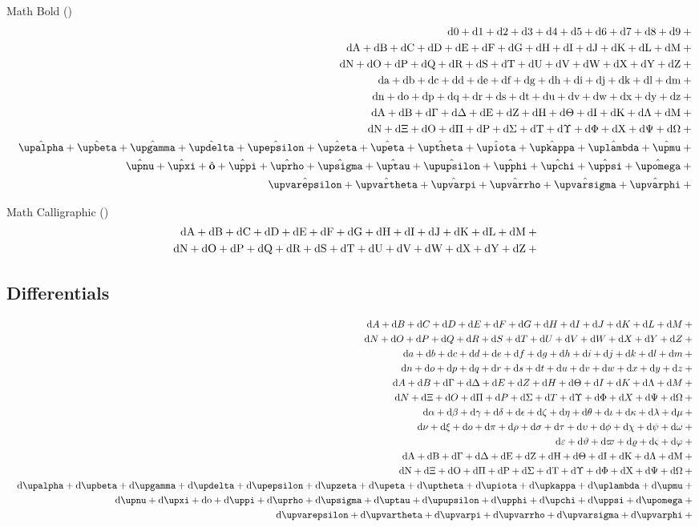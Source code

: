 \documentclass[11pt, a4paper, oneside]{article}
\newcommand{\dd}{\mathrm{d}}
\theoremstyle{Plain}
\theoremstyle{Definition}
\theoremstyle{Remark}
\begin{document}
\begin{appendix}
	Math Bold (\texttt{\string\mathbf})
	\def\test#1{\hat{\mathbf{#1}}+{}}%
	\begin{eqnarray*}
	  && {\testnums}\\
	  && {\testupperi}\\
	  && {\testupperii}\\
	  && {\testloweri}\\
	  && {\testlowerii}\\
	  && {\testupgreeki}\\
	  && {\testupgreekii}\\
	  && {\def\test#1{\hat{\bm{\mathbf{#1}}}+{}}\testlowgreekupi}\\
	  && {\def\test#1{\hat{\bm{\mathbf{#1}}}+{}}\testlowgreekupii}\\
	  && {\def\test#1{\hat{\bm{\mathbf{#1}}}+{}}\testlowgreekupiii}
	\end{eqnarray*}

	Math Calligraphic (\texttt{\string\mathcal})
	\def\test#1{\hat{\mathcal{#1}}+{}}%
	\begin{eqnarray*}
	  && {\testupperi}\\
	  && {\testupperii}
	\end{eqnarray*}%

	\subsection{Differentials \showfamily}

	\begin{eqnarray*}
	\gdef\test#1{\dd #1+{}}%
	  && {\testupperi}\\
	  && {\testupperii}\\
	  && {\testloweri}\\
	  && {\testlowerii}\\
	  && {\testupgreeki}\\
	  && {\testupgreekii}\\
	  && {\testlowgreeki}\\
	  && {\testlowgreekii}\\
	  && {\testlowgreekiii}\\
	\gdef\test#1{\dd \mathrm{#1}+{}}%
	  && {\testupgreeki}\\
	  && {\testupgreekii}\\
	  && {\testlowgreekupi}\\
	  && {\testlowgreekupii}\\
	  && {\testlowgreekupiii}\\
	\end{eqnarray*}%


\end{appendix}
\end{document}

